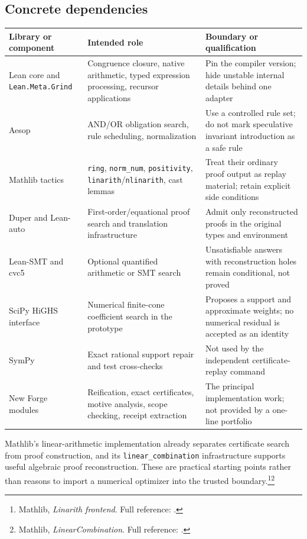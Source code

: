 \documentclass[11pt,letterpaper]{article}
\newcommand{\Lean}{\textsf{Lean}}
\newcommand{\Forge}{\textsf{Forge}}
\newcommand{\src}[2]{\footnote{#2. Full reference: \cite{#1}.}}
\theoremstyle{definition}
\theoremstyle{remark}
\begin{document}
\subsection{Concrete dependencies}
\begin{longtable}{@{}p{}p{}p{}@{}}
\toprule
Library or component & Intended role & Boundary or qualification \\
\midrule\endhead
\Lean{} core and \texttt{Lean.Meta.Grind} & Congruence closure, native arithmetic, typed expression processing, recursor applications & Pin the compiler version; hide unstable internal details behind one adapter \\
Aesop & AND/OR obligation search, rule scheduling, normalization & Use a controlled rule set; do not mark speculative invariant introduction as a safe rule \\
Mathlib tactics & \texttt{ring}, \texttt{norm\_num}, \texttt{positivity}, \texttt{linarith}/\texttt{nlinarith}, cast lemmas & Treat their ordinary proof output as replay material; retain explicit side conditions \\
Duper and Lean-auto & First-order/equational proof search and translation infrastructure & Admit only reconstructed proofs in the original types and environment \\
Lean-SMT and cvc5 & Optional quantified arithmetic or SMT search & Unsatisfiable answers with reconstruction holes remain conditional, not proved \\
SciPy HiGHS interface & Numerical finite-cone coefficient search in the prototype & Proposes a support and approximate weights; no numerical residual is accepted as an identity \\
SymPy & Exact rational support repair and test cross-checks & Not used by the independent certificate-replay command \\
New \Forge{} modules & Reification, exact certificates, motive analysis, scope checking, receipt extraction & The principal implementation work; not provided by a one-line portfolio \\
\bottomrule
\end{longtable}

Mathlib's linear-arithmetic implementation already separates certificate search from proof construction, and its \texttt{linear\_combination} infrastructure supports useful algebraic proof reconstruction. These are practical starting points rather than reasons to import a numerical optimizer into the trusted boundary.\src{linarith}{Mathlib, \emph{Linarith frontend}}\src{linearcombination}{Mathlib, \emph{LinearCombination}}
\end{document}
